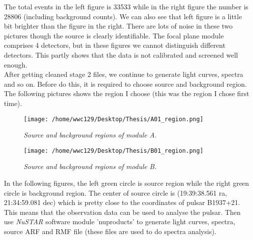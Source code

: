 \documentclass[12pt]{report}
\begin{document}
        The total events in the left figure is 33533 while in the right figure the number is 28806 
        (including background counts). We can also see that left figure is a little bit brighter than the figure
        in the right. There are lots of noise in these two pictures though the source is clearly identifiable. The 
        focal plane module comprises 4 detectors, but in these figures we cannot distinguish different detectors. 
        This partly shows that the data is not calibrated and screened well enough. \\
        \indent After getting cleaned stage 2 files, we continue to generate light curves, spectra and so on. 
        Before do this, it is required to choose source and background region. The following pictures shows the 
        region I choose (this was the region I chose first time). 
          
        \begin{figure}[h]
          \hspace{0.7cm}
          \begin{minipage}{0.45\textwidth} 
            \centering 
            \texttt{[image: /home/wwc129/Desktop/Thesis/A01\_region.png]}
            \caption{\textit{\footnotesize Source and background regions of module A. }}
          \end{minipage}
          \hspace{0.1cm} 
          \begin{minipage}{0.45\textwidth}
            \centering 
            \texttt{[image: /home/wwc129/Desktop/Thesis/B01\_region.png]}
            \caption{\textit{\footnotesize Source and background regions of module B. }}
          \end{minipage}
        \end{figure}
        
        In the following figures, the left green circle is source region while the right green circle is 
        background region. The center of source circle is (19:39:38.561 ra, 21:34:59.081 dec) which is pretty 
        close to the coordinates of pulsar B1937+21. This means that the observation data can be used to analyse 
        the pulsar. Then use \textit{NuSTAR} software module 'nuproducts' to generate light curves, spectra, 
        source ARF and RMF file (these files are used to do spectra analysis). 












		
			

    
\end{document}
